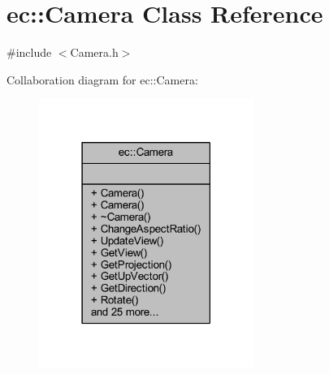 \hypertarget{classec_1_1_camera}{}\section{ec\+:\+:Camera Class Reference}
\label{classec_1_1_camera}


{\ttfamily \#include $<$Camera.\+h$>$}



Collaboration diagram for ec\+:\+:Camera\+:
\nopagebreak
\begin{figure}[H]
\begin{center}
\leavevmode
\includegraphics[width=198pt]{classec_1_1_camera__coll__graph}
\end{center}
\end{figure}
